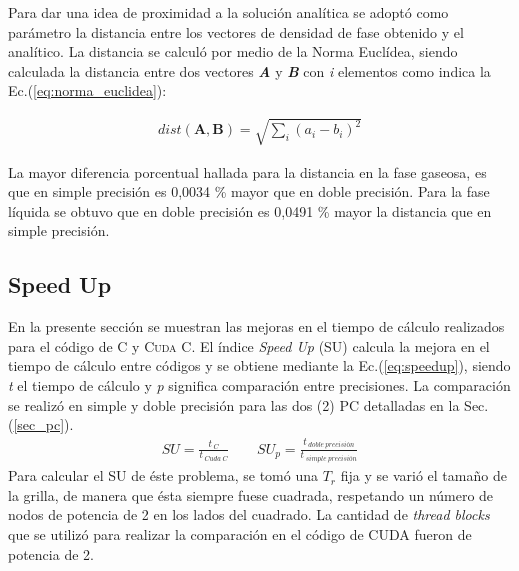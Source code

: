 
Para dar una idea de proximidad a la solución analítica se adoptó como parámetro la distancia entre los vectores de densidad de fase obtenido y el analítico. La distancia se calculó por medio de la Norma Euclídea, siendo calculada la distancia entre dos vectores \textbf{\textit{A}} y \textbf{\textit{B}} con \textit{i} elementos como indica la Ec.(\ref{eq:norma_euclidea}):

\begin{align}
dist(\mathbf{A},\mathbf{B}) = \sqrt{\sum_i {\left( a_i - b_i \right)}^2  }
\label{eq:norma_euclidea}
\end{align}


La mayor diferencia porcentual hallada para la distancia en la fase gaseosa, es que en simple precisión es 0,0034 \% mayor que en doble precisión. Para la fase líquida se obtuvo que en doble precisión es 0,0491 \% mayor la distancia que en simple precisión.


%

\newpage

\subsection{Speed Up}

En la presente sección se muestran las mejoras en el tiempo de cálculo realizados para el código de \textsc{C} y \textsc{Cuda C}. El índice \textit{Speed Up} (SU) calcula la mejora en el tiempo de cálculo entre códigos y se obtiene mediante la Ec.(\ref{eq:speedup}), siendo \textit{t} el tiempo de cálculo y \textit{p} significa comparación entre precisiones. La comparación se realizó en simple y doble precisión para las dos (2) PC detalladas en la Sec. (\ref{sec_pc}).
\begin{align}
	SU = \frac{t_{\>C}}{t_{\>Cuda \> C}} \qquad 	{SU}_p = \frac{t_{\>doble \> precisión}}{t_{\>simple \> precisión}} 
	\label{eq:speedup}
\end{align}
Para calcular el \textsc{SU} de éste problema, se tomó una $T_r$ fija y se varió el tamaño de la grilla, de manera que ésta siempre fuese cuadrada, respetando un número de nodos de potencia de 2 en los lados del cuadrado. La cantidad de \textit{thread blocks} que se utilizó para realizar la comparación en el código de \textsc{CUDA} fueron de potencia de 2.

